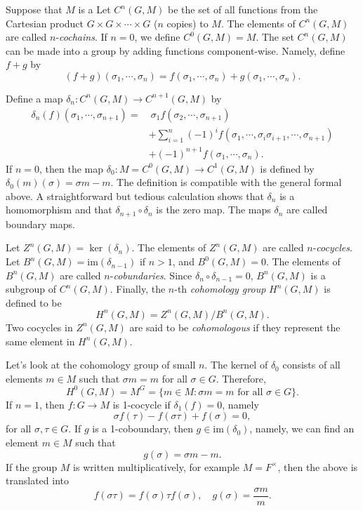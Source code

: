 \documentclass[12pt]{report}
\theoremstyle{definition}
\newcommand{\im}{\text{im}}
\begin{document}
Suppose that $M$ is a Let $C^n(G,M)$ be the set of all functions from the Cartesian product $G\times G\times\cdots\times G$ ($n$ copies) to $M$. The elements of $C^n(G,M)$ are called $n$-\emph{cochains}. If $n=0$, we define $C^0(G,M)=M$. The set $C^n(G,M)$ can be made into a group by adding functions component-wise. Namely, define $f+g$  by $$(f+g)(\sigma_1,\cdots,\sigma_n)=f(\sigma_1,\cdots,\sigma_n)+g(\sigma_1,\cdots,\sigma_n).$$

Define a map $\delta_n: C^n(G,M)\to C^{n+1}(G,M)$ by \begin{align*}
	\delta_n(f)(\sigma_1,\cdots,\sigma_{n+1})= & ~ \sigma_1f(\sigma_2,\cdots,\sigma_{n+1})                                      \\
	                                           & +\sum_{i=1}^n(-1)^if(\sigma_1,\cdots,\sigma_i\sigma_{i+1},\cdots,\sigma_{n+1}) \\
	                                           & + (-1)^{n+1} f(\sigma_1,\cdots,\sigma_n).
\end{align*}
If $n=0$, then the map $\delta_0: M=C^0(G,M)\to C^1(G,M)$ is defined by $\delta_0(m)(\sigma)=\sigma m-m$. The definition is compatible with the general formal above. A straightforward but tedious calculation shows that $\delta_n$ is a homomorphism and that $\delta_{n+1}\circ\delta_n$ is the zero map. The maps $\delta_n$ are called boundary maps.


Let $Z^n(G,M)=\ker(\delta_n)$. The elements of $Z^n(G,M)$ are called $n$-\emph{cocycles}. Let $B^n(G,M)=\im(\delta_{n-1})$ if $n>1$, and $B^0(G,M)=0$. The elements of $B^n(G,M)$ are called $n$-\emph{cobundaries}. Since $\delta_n\circ\delta_{n-1}=0$, $B^n(G,M)$ is a subgroup of $C^n(G,M)$. Finally, the $n$-th \emph{cohomology group} $H^n(G,M)$ is defined to be $$H^n(G,M)=Z^n(G,M)/B^n(G,M).$$ Two cocycles in $Z^n(G,M)$ are said to be \emph{cohomologous} if they represent the same element in $H^n(G,M)$.

Let's look at the cohomology group of small $n$. The kernel of $\delta_0$ consists of all elements $m\in M$ such that $\sigma m=m$ for all $\sigma\in G$. Therefore, $$H^0(G,M)=M^G=\{m\in M: \sigma m =m \mbox{ for all }\sigma\in G\}.$$
If $n=1$, then $f:G\to M$ is 1-cocycle if $\delta_1(f)=0$, namely $$\sigma f(\tau)-f(\sigma\tau)+f(\sigma)=0,$$ for all $\sigma,\tau \in G$. If $g$ is a 1-coboundary, then $g\in \im(\delta_0)$, namely, we can find an element $m\in M$ such that $$g(\sigma)=\sigma m -m.$$ If the group $M$ is written multiplicatively, for example $M= F^\times$, then the above is translated into $$f(\sigma\tau)=f(\sigma)\tau f(\sigma),\quad g(\sigma)=\frac{\sigma m}{m}.$$
\end{document}
